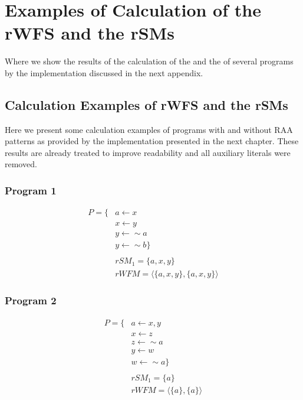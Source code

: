 \chapter{Examples of Calculation of the rWFS and the rSMs}
\label{ap:examples}

\begin{ChapAbstract}
Where we show the results of the calculation of the \rsms and the \rwfm of several programs by the implementation discussed in the next appendix.
\end{ChapAbstract}

\section{Calculation Examples of rWFS and the rSMs}
Here we present some calculation examples of programs with and without RAA patterns as provided by the implementation presented in the next chapter. These results are already treated to improve readability and all \cf auxiliary literals were removed.


\subsection{Program 1}
\begin{align*}
P=\{
& a\leftarrow x\\
& x\leftarrow y\\
& y\leftarrow \sim a\\
& y\leftarrow \sim b
\}\\
\\
& rSM_{1}=\{a,x,y\}\\
& rWFM=\langle\{a,x,y\},\{a,x,y\}\rangle
\end{align*}


\subsection{Program 2}
\begin{align*}
P=\{
& a\leftarrow x,y\\
& x\leftarrow z\\
& z\leftarrow \sim a\\
& y\leftarrow w\\
& w\leftarrow \sim a
\}\\
\\
& rSM_{1}=\{a\}\\
& rWFM=\langle\{a\},\{a\}\rangle\end{align*}

